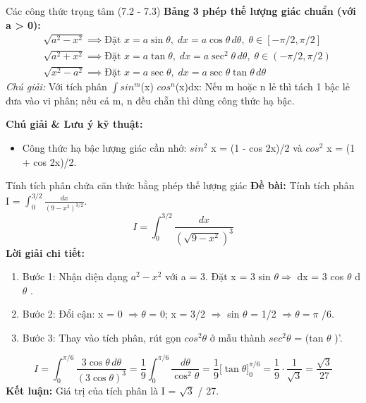 \documentclass[11pt,a4paper,oneside]{book}
\begin{document}
\begin{congthuc}{Các công thức trọng tâm (7.2 - 7.3)}
\noindent\textbf{Bảng 3 phép thế lượng giác chuẩn (với a > 0):}
\[ \begin{aligned} &\sqrt{a^2 - x^2} \implies \text{Đặt } x = a\sin\theta, \; dx = a\cos\theta\,d\theta, \; \theta \in [-\pi/2, \pi/2] \\ &\sqrt{a^2 + x^2} \implies \text{Đặt } x = a\tan\theta, \; dx = a\sec^2\theta\,d\theta, \; \theta \in (-\pi/2, \pi/2) \\ &\sqrt{x^2 - a^2} \implies \text{Đặt } x = a\sec\theta, \; dx = a\sec\theta\tan\theta\,d\theta \end{aligned} \]
\noindent\textit{Chú giải:} Với tích phân $\int sin^m$(x) $cos^n$(x)dx: Nếu m hoặc n lẻ thì tách 1 bậc lẻ đưa vào vi phân; nếu cả m, n đều chẵn thì dùng công thức hạ bậc.\\[4pt]
\end{congthuc}

\noindent\textbf{Chú giải \& Lưu ý kỹ thuật:}
\begin{itemize}[leftmargin=1.5em, itemsep=2pt]
  \item Công thức hạ bậc lượng giác cần nhớ: $sin^2$ x = (1 - cos 2x)/2 và $cos^2$ x = (1 + cos 2x)/2.
\end{itemize}

\begin{vidu}{Tính tích phân chứa căn thức bằng phép thế lượng giác}
\textbf{Đề bài:} Tính tích phân I = $\int_0^{3/2} \frac{dx}{(9 - x^2)^{3/2}}$.
\[ I = \int_0^{3/2} \frac{dx}{(\sqrt{9 - x^2})^3} \]
\textbf{Lời giải chi tiết:}
\begin{enumerate}[leftmargin=1.5em, itemsep=2pt]
  \item Bước 1: Nhận diện dạng $a^2 - x^2$ với a = 3. Đặt x = 3 sin $\theta \Rightarrow$  dx = 3 cos $\theta$  d$\theta$ .
  \item Bước 2: Đổi cận: x = 0 $\Rightarrow \theta$  = 0; x = 3/2 $\Rightarrow$  sin $\theta$  = 1/2 $\Rightarrow \theta = \pi$ /6.
  \item Bước 3: Thay vào tích phân, rút gọn $cos^2 \theta$  ở mẫu thành $sec^2 \theta$  = (tan $\theta$ )'.
\end{enumerate}
\[ I = \int_0^{\pi/6} \frac{3\cos\theta\,d\theta}{(3\cos\theta)^3} = \frac{1}{9} \int_0^{\pi/6} \frac{d\theta}{\cos^2\theta} = \frac{1}{9}\Big[\tan\theta\Big]_0^{\pi/6} = \frac{1}{9} \cdot \frac{1}{\sqrt{3}} = \frac{\sqrt{3}}{27} \]
\noindent\textbf{Kết luận:} Giá trị của tích phân là I = $\sqrt{3}$ / 27.
\end{vidu}
\end{document}
